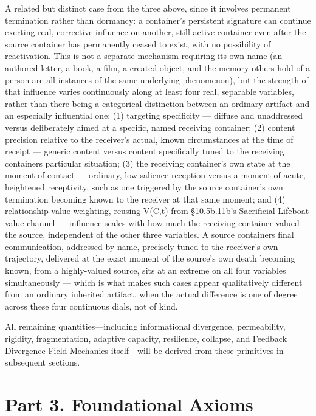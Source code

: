 \documentclass[
]{article}
\begin{document}
A related but distinct case from the three above, since it involves
permanent termination rather than dormancy: a container's persistent
signature can continue exerting real, corrective influence on another,
still-active container even after the source container has permanently
ceased to exist, with no possibility of reactivation. This is not a
separate mechanism requiring its own name (an authored letter, a book, a
film, a created object, and the memory others hold of a person are all
instances of the same underlying phenomenon), but the strength of that
influence varies continuously along at least four real, separable
variables, rather than there being a categorical distinction between an
ordinary artifact and an especially influential one: (1) targeting
specificity --- diffuse and unaddressed versus deliberately aimed at a
specific, named receiving container; (2) content precision relative to
the receiver's actual, known circumstances at the time of receipt ---
generic content versus content specifically tuned to the receiving
containers particular situation; (3) the receiving container's own state
at the moment of contact --- ordinary, low-salience reception versus a
moment of acute, heightened receptivity, such as one triggered by the
source container's own termination becoming known to the receiver at
that same moment; and (4) relationship value-weighting, reusing V(C,t)
from §10.5b.11b's Sacrificial Lifeboat value channel --- influence
scales with how much the receiving container valued the source,
independent of the other three variables. A source containers final
communication, addressed by name, precisely tuned to the receiver's own
trajectory, delivered at the exact moment of the source's own death
becoming known, from a highly-valued source, sits at an extreme on all
four variables simultaneously --- which is what makes such cases appear
qualitatively different from an ordinary inherited artifact, when the
actual difference is one of degree across these four continuous dials,
not of kind.

All remaining quantities---including informational divergence,
permeability, rigidity, fragmentation, adaptive capacity, resilience,
collapse, and Feedback Divergence Field Mechanics itself---will be
derived from these primitives in subsequent sections.

\hypertarget{part-3.-foundational-axioms}{%
\section{Part 3. Foundational
Axioms}\label{part-3.-foundational-axioms}}
\end{document}
